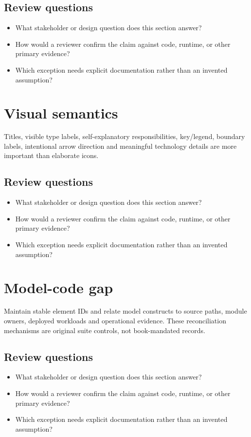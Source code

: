 \documentclass[10pt,letterpaper]{article}
\begin{document}
\subsection{Review questions}
\begin{itemize}
\item What stakeholder or design question does this section answer?
\item How would a reviewer confirm the claim against code, runtime, or other primary evidence?
\item Which exception needs explicit documentation rather than an invented assumption?
\end{itemize}

\section{Visual semantics}
Titles, visible type labels, self-explanatory responsibilities, key/legend, boundary labels, intentional arrow direction and meaningful technology details are more important than elaborate icons.


\subsection{Review questions}
\begin{itemize}
\item What stakeholder or design question does this section answer?
\item How would a reviewer confirm the claim against code, runtime, or other primary evidence?
\item Which exception needs explicit documentation rather than an invented assumption?
\end{itemize}

\section{Model-code gap}
Maintain stable element IDs and relate model constructs to source paths, module owners, deployed workloads and operational evidence. These reconciliation mechanisms are original suite controls, not book-mandated records.


\subsection{Review questions}
\begin{itemize}
\item What stakeholder or design question does this section answer?
\item How would a reviewer confirm the claim against code, runtime, or other primary evidence?
\item Which exception needs explicit documentation rather than an invented assumption?
\end{itemize}
\end{document}
